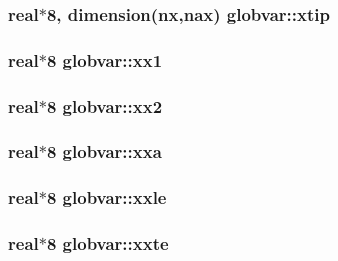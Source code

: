 \subsubsection[{xtip}]{\setlength{\rightskip}{0pt plus 5cm}real$\ast$8, dimension({\bf nx},{\bf nax}) globvar\+::xtip}\label{namespaceglobvar_adeaf213bc236c950b34c4e2fb10cf12d}
\hypertarget{namespaceglobvar_aabbafc0271d82fa75c53362dae7fd8e2}{}
\subsubsection[{xx1}]{\setlength{\rightskip}{0pt plus 5cm}real$\ast$8 globvar\+::xx1}\label{namespaceglobvar_aabbafc0271d82fa75c53362dae7fd8e2}
\hypertarget{namespaceglobvar_a6b2d075e483f21e7f6949da41ccf8cf0}{}
\subsubsection[{xx2}]{\setlength{\rightskip}{0pt plus 5cm}real$\ast$8 globvar\+::xx2}\label{namespaceglobvar_a6b2d075e483f21e7f6949da41ccf8cf0}
\hypertarget{namespaceglobvar_afad18bcdd2851c42afdc9ace1240fad7}{}
\subsubsection[{xxa}]{\setlength{\rightskip}{0pt plus 5cm}real$\ast$8 globvar\+::xxa}\label{namespaceglobvar_afad18bcdd2851c42afdc9ace1240fad7}
\hypertarget{namespaceglobvar_ac2cc4848cc474dd9b462d3afc303ee1a}{}
\subsubsection[{xxle}]{\setlength{\rightskip}{0pt plus 5cm}real$\ast$8 globvar\+::xxle}\label{namespaceglobvar_ac2cc4848cc474dd9b462d3afc303ee1a}
\hypertarget{namespaceglobvar_a126df8300f71cf717dece199b0a5478d}{}
\subsubsection[{xxte}]{\setlength{\rightskip}{0pt plus 5cm}real$\ast$8 globvar\+::xxte}\label{namespaceglobvar_a126df8300f71cf717dece199b0a5478d}
\hypertarget{namespaceglobvar_a32441db96414a17de3451c8789d1edb3}{}

